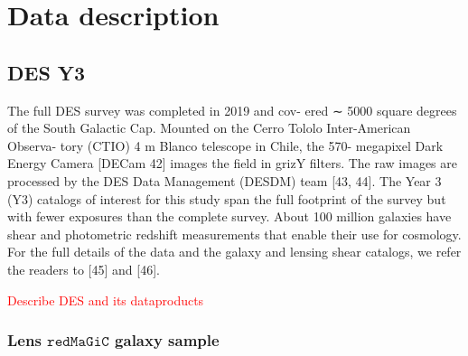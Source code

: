 \documentclass[fleqn,usenatbib]{mnras}
\newcommand{\redmagic}{\texttt{redMaGiC} }
\newcommand{\red}[1]{\textcolor{red}{#1}}
\begin{document}



    
    

 

\section{Data description}

\subsection{DES Y3}

The full DES survey was completed in 2019 and cov- ered ∼ 5000 square degrees of the South Galactic Cap. Mounted on the Cerro Tololo Inter-American Observa- tory (CTIO) 4 m Blanco telescope in Chile, the 570- megapixel Dark Energy Camera [DECam 42] images the field in grizY filters. The raw images are processed by the DES Data Management (DESDM) team [43, 44]. The Year 3 (Y3) catalogs of interest for this study span the full footprint of the survey but with fewer exposures than the complete survey. About 100 million galaxies have shear and photometric redshift measurements that enable their use for cosmology. For the full details of the data and the galaxy and lensing shear catalogs, we refer the readers to [45] and [46].


\red{Describe DES and its dataproducts}
\subsubsection{Lens $\redmagic$ galaxy sample}
\end{document}

